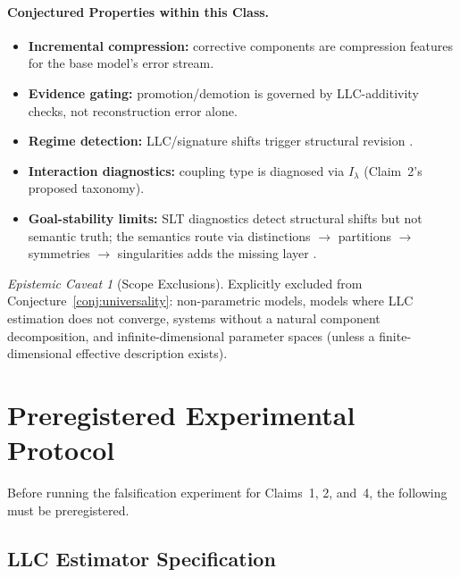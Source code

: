 \documentclass[11pt,a4paper]{article}
\theoremstyle{definition}
\theoremstyle{remark}
\newtheorem{caveat}[theorem]{Epistemic Caveat}
\newcommand{\Ilambda}{I_{\lambda}}
\begin{document}
\paragraph{Conjectured Properties within this Class.}
\begin{itemize}
  \item \textbf{Incremental compression:} corrective components are compression
    features for the base model's error stream.
  \item \textbf{Evidence gating:} promotion/demotion is governed by
    LLC-additivity checks, not reconstruction error alone.
  \item \textbf{Regime detection:} LLC/signature shifts trigger structural
    revision \cite{SLT-Regime}.
  \item \textbf{Interaction diagnostics:} coupling type is diagnosed via
    $\Ilambda$ (Claim~2's proposed taxonomy).
  \item \textbf{Goal-stability limits:} SLT diagnostics detect structural
    shifts but not semantic truth; the semantics route via distinctions
    $\to$ partitions $\to$ symmetries $\to$ singularities adds the missing
    layer \cite{SLT-GoalStab,SLT-Semantics}.
\end{itemize}

\begin{caveat}[Scope Exclusions]\label{cav:scope}
  Explicitly excluded from Conjecture~\ref{conj:universality}: non-parametric
  models, models where LLC estimation does not converge, systems without a
  natural component decomposition, and infinite-dimensional parameter spaces
  (unless a finite-dimensional effective description exists).
\end{caveat}

\section{Preregistered Experimental Protocol}\label{sec:protocol}

Before running the falsification experiment for Claims~1, 2, and~4, the
following must be preregistered.

\subsection{LLC Estimator Specification}\label{subsec:estimator}
\end{document}
